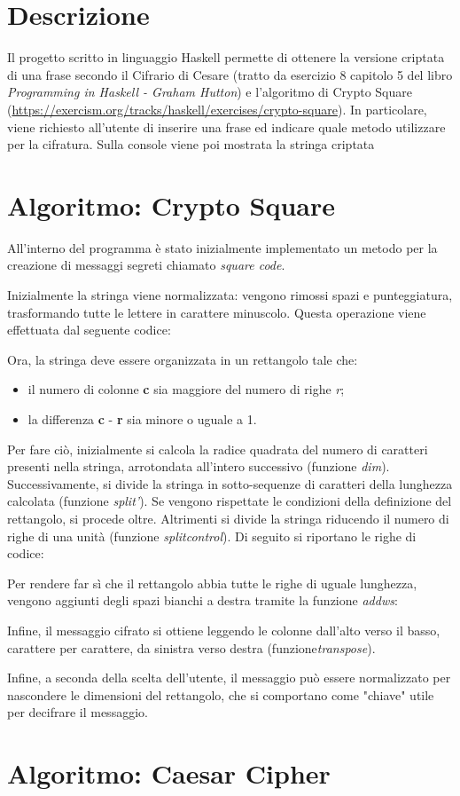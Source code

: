 \section{Descrizione}
Il progetto scritto in linguaggio Haskell permette di ottenere la versione criptata di una frase secondo il Cifrario di Cesare (tratto da esercizio 8 capitolo 5 del libro \textit{Programming in Haskell - Graham Hutton}) e l'algoritmo di Crypto Square (\url{https://exercism.org/tracks/haskell/exercises/crypto-square}). In particolare, viene richiesto all'utente di inserire una frase ed indicare quale metodo utilizzare per la cifratura. Sulla console viene poi mostrata la stringa criptata

\section{Algoritmo: Crypto Square}
All'interno del programma è stato inizialmente implementato un metodo per la creazione di messaggi segreti chiamato \textit{square code}. 

Inizialmente la stringa viene normalizzata: vengono rimossi spazi e punteggiatura, trasformando tutte le lettere in carattere minuscolo. Questa operazione viene effettuata dal seguente codice:

Ora, la stringa deve essere organizzata in un rettangolo tale che:
\begin{itemize}
	\item il numero di colonne \textbf{c} sia maggiore del numero di righe \textit{r};
	\item la differenza \textbf{c} - \textbf{r} sia minore o uguale a 1. 
\end{itemize}
Per fare ciò, inizialmente si calcola la radice quadrata del numero di caratteri presenti nella stringa, arrotondata all'intero successivo (funzione \textit{dim}). Successivamente, si divide la stringa in sotto-sequenze di caratteri della lunghezza calcolata (funzione \textit{split'}). Se vengono rispettate le condizioni della definizione del rettangolo, si procede oltre. Altrimenti si divide la stringa riducendo il numero di righe di una unità (funzione \textit{splitcontrol}). Di seguito si riportano le righe di codice:

Per rendere far sì che il rettangolo abbia tutte le righe di uguale lunghezza, vengono aggiunti degli spazi bianchi a destra tramite la funzione \textit{addws}:

Infine, il messaggio cifrato si ottiene leggendo le colonne dall'alto verso il basso, carattere per carattere, da sinistra verso destra (funzione\textit{transpose}).

Infine, a seconda della scelta dell'utente, il messaggio può essere normalizzato per nascondere le dimensioni del rettangolo, che si comportano come "chiave" utile per decifrare il messaggio.

\section{Algoritmo: Caesar Cipher}